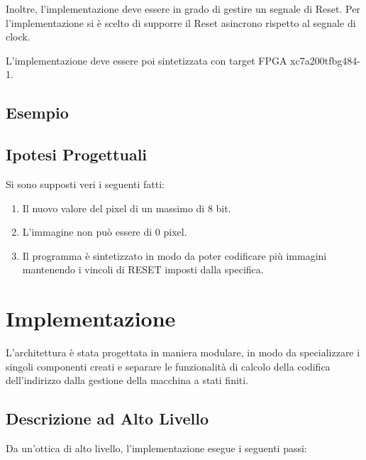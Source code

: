 \documentclass{article}
\begin{document}
Inoltre, l'implementazione deve essere in grado di gestire un segnale di Reset. Per l'implementazione si è scelto di supporre il Reset asincrono rispetto al segnale di clock.

L'implementazione deve essere poi sintetizzata con target FPGA xc7a200tfbg484-1.

\subsection{Esempio}


\subsection{Ipotesi Progettuali}
\label{ipotesi}
Si sono supposti veri i seguenti fatti:
\begin{enumerate}
\item Il nuovo valore del pixel di un massimo di 8 bit.
\item L'immagine non può essere di 0 pixel.
\item Il programma è sintetizzato in modo da poter codificare più immagini mantenendo i vincoli di RESET imposti dalla specifica. 
\end{enumerate}
 

\section{Implementazione}

L'architettura è stata progettata in maniera modulare, in modo da specializzare i singoli componenti creati e separare le funzionalità
di calcolo della codifica dell'indirizzo dalla gestione della macchina a stati finiti.


\subsection{Descrizione ad Alto Livello}
\label{alto_livello}

Da un'ottica di alto livello, l'implementazione esegue i seguenti passi:
\end{document}
